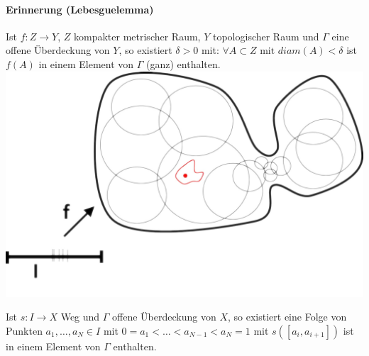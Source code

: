\documentclass[a4paper,11pt,notitlepage]{report}
\theoremstyle{definition}
\begin{document}
\paragraph{Erinnerung (Lebesguelemma)}
Ist $f \colon Z \rightarrow Y$, $Z$ kompakter metrischer Raum, $Y$ topologischer Raum und $\Gamma$ eine offene Überdeckung von $Y$, so existiert $\delta > 0$ mit: \newline  $\forall A \subset Z \text{ mit } diam(A) < \delta$ ist $f(A)$ in einem Element von $\Gamma$ (ganz) enthalten. \newline \includegraphics[scale=0.4]{images/Lebesguelemma.png}

\begin{corollary}{}
	Ist $s \colon I \rightarrow X$ Weg und $\Gamma$ offene Überdeckung von $X$, so existiert eine Folge von Punkten \newline $a_1, \ldots, a_N \in I$ mit $0 = a_1 < \ldots < a_{N-1} < a_N = 1$ mit \newline $s([a_i, a_{i+1}])$ ist in einem Element von $\Gamma$ enthalten.
\end{corollary}
\end{document}
